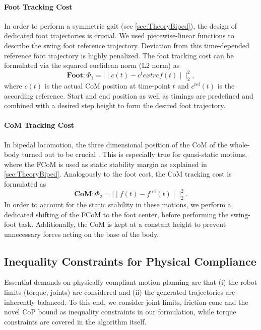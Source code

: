 \paragraph{Foot Tracking Cost}
In order to perform a symmetric gait (see \cref{sec:TheoryBiped}), the design of dedicated foot trajectories is crucial. We used piecewise-linear functions to describe the swing foot reference trajectory. Deviation from this time-depended reference foot trajectory is highly penalized. The foot tracking cost can be formulated via the squared euclidean norm (L2 norm) as
\begin{equation*} 
\textbf{Foot}: \Phi_1=\mid\mid c(t)-c^text{ref}(t)\mid\mid^2_2,
\end{equation*}
where $c(t)$ is the actual \gls{CoM} position at time-point $t$ and $c^\text{ref}(t)$ is the according reference. Start and end position as well as timings are predefined and combined with a desired step height to form the desired foot trajectory. 

\paragraph{\Gls{CoM} Tracking Cost}
In bipedal locomotion, the three dimensional position of the \gls{CoM} of the whole-body turned out to be crucial \cite{carpentier2017centre}. This is especially true for quasi-static motions, where the \gls{FCoM} is used as static stability margin as explained in \cref{sec:TheoryBiped}. Analogously to the foot cost, the \gls{CoM} tracking cost is formulated as
\begin{equation*} 
\textbf{CoM}: \Phi_2=\mid\mid f(t)-f^\text{ref}(t)\mid\mid^2_2.
\end{equation*}
In order to account for the static stability in these motions, we perform a dedicated shifting of the \gls{FCoM} to the foot center, before performing the swing-foot task. Additionally, the \gls{CoM} is kept at a constant height to prevent unnecessary forces acting on the base of the body. 

\subsection{Inequality Constraints for Physical Compliance}
Essential demands on physically compliant motion planning are that (i) the robot limits (torque, joints) are considered and (ii) the generated trajectories are inherently balanced. To this end, we consider joint limits, friction cone and the novel \gls{CoP} bound as inequality constraints in our formulation, while torque constraints are covered in the algorithm itself.

